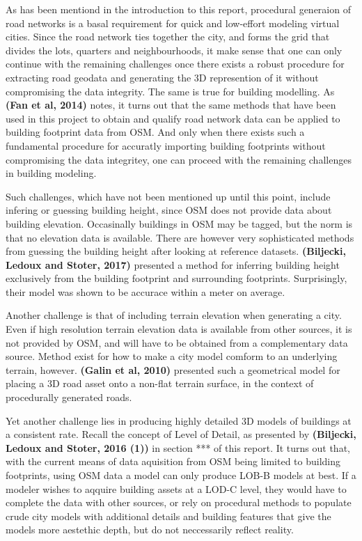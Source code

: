 \documentclass{kththesis}
\begin{document}
As has been mentiond in the introduction to this report, procedural generaion of road networks is a basal requirement for quick and low-effort modeling virtual cities.
Since the road network ties together the city, and forms the grid that divides the lots, quarters and neighbourhoods, it make sense that one can only continue with the remaining challenges once there exists a robust procedure for extracting road geodata and generating the 3D represention of it without compromising the data integrity. 
The same is true for building modelling.
As \textbf{(Fan et al, 2014)} notes, it turns out that the same methods that have been used in this project to obtain and qualify road network data can be applied to building footprint data from OSM. 
And only when there exists such a fundamental procedure for accuratly importing building footprints without compromising the data integritey, one can proceed with the remaining challenges in building modeling.

Such challenges, which have not been mentioned up until this point, include infering or guessing building height, since OSM does not provide data about building elevation.
Occasinally buildings in OSM may be tagged, but the norm is that no elevation data is available.
There are however very sophisticated methods from guessing the building height after looking at reference datasets.
\textbf{(Biljecki, Ledoux and Stoter, 2017)} presented a method for inferring building height exclusively from the building footprint and surrounding footprints.
Surprisingly, their model was shown to be accurace within a meter on average.

Another challenge is that of including terrain elevation when generating a city.
Even if high resolution terrain elevation data is available from other sources, it is not provided by OSM, and will have to be obtained from a complementary data source.
Method exist for how to make a city model comform to an underlying terrain, however.
\textbf{(Galin et al, 2010)} presented such a geometrical model for placing a 3D road asset onto a non-flat terrain surface, in the context of procedurally generated roads.

Yet another challenge lies in producing highly detailed 3D models of buildings at a consistent rate.
Recall the concept of Level of Detail, as presented by \textbf{(Biljecki, Ledoux and Stoter, 2016 (1))} in section *** of this report.
It turns out that, with the current means of data aquisition from OSM being limited to building footprints, using OSM data a model can only produce LOB-B models at best.
If a modeler wishes to aqquire building assets at a LOD-C level, they would have to complete the data with other sources, or rely on procedural methods to populate crude city models with additional details and building features that give the models more aestethic depth, but do not neccessarily reflect reality.
\end{document}
